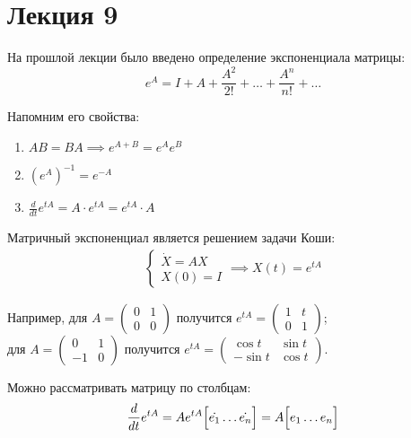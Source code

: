 \section{Лекция 9}

На прошлой лекции было введено определение экспоненциала матрицы:
\begin{equation*}
    e^{A} = I + A + \frac{A^2}{2!} + \ldots + \frac{A^n}{n!} + \ldots
\end{equation*}

Напомним его свойства:
\begin{enumerate}
    \item $A B = B A \implies e^{A + B} = e^{A} e^{B}$
    \item $\left( e^{A} \right)^{-1} = e^{-A}$
    \item $ \frac{d}{dt} e^{tA} = A \cdot e^{tA} = e^{tA} \cdot A$
\end{enumerate}

Матричный экспоненциал является решением задачи Коши:
\begin{gather*}
    \begin{cases}
        \dot{X} = A X \\
        X(0) = I
    \end{cases}
    \implies X(t) = e^{tA}
\end{gather*}

Например, для $ A = \left( \begin{matrix}
    0 & 1 \\
    0 & 0
\end{matrix} \right)$ получится $e^{tA} = \left( \begin{matrix}
    1 & t \\
    0 & 1
\end{matrix} \right)$; \\
для $ A = \left( \begin{matrix}
    0 & 1 \\
    -1 & 0
\end{matrix} \right)$ получится $e^{tA} = \left( \begin{matrix}
    \cos t & \sin t \\
    -\sin t & \cos t
\end{matrix} \right)$.

Можно рассматривать матрицу по столбцам:
\begin{gather*}
    \frac{d}{dt} e^{tA} = A e^{tA} 
    \Bigl[ \dot{e_1}  \ldots  \dot{e_n} \Bigr] = A \Bigl[ e_1 \ldots e_n \Bigr]
\end{gather*}

